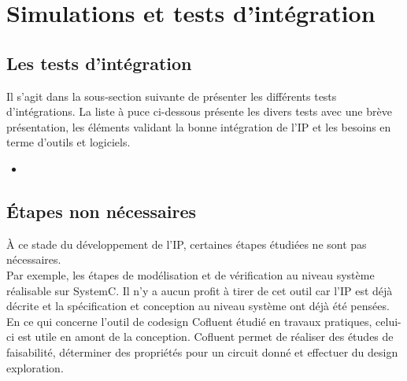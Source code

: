 \section{Simulations et tests d'intégration}

\subsection{Les tests d'intégration}

Il s'agit dans la sous-section suivante de présenter les différents tests d'intégrations.
La liste à puce ci-dessous présente les divers tests avec une brève présentation, les éléments validant la bonne intégration de l'IP et les besoins en terme d'outils et logiciels.

\begin{itemize}
	\item 
\end{itemize}

\subsection{Étapes non nécessaires}

À ce stade du développement de l'IP, certaines étapes étudiées ne sont pas nécessaires.\\

Par exemple, les étapes de modélisation et de vérification au niveau système réalisable sur SystemC.
Il n'y a aucun profit à tirer de cet outil car l'IP est déjà décrite et la spécification et conception au niveau système ont déjà été pensées.\\

En ce qui concerne l'outil de codesign Cofluent étudié en travaux pratiques, celui-ci est utile en amont de la conception.
Cofluent permet de réaliser des études de faisabilité, déterminer des propriétés pour un circuit donné et effectuer du design exploration.
